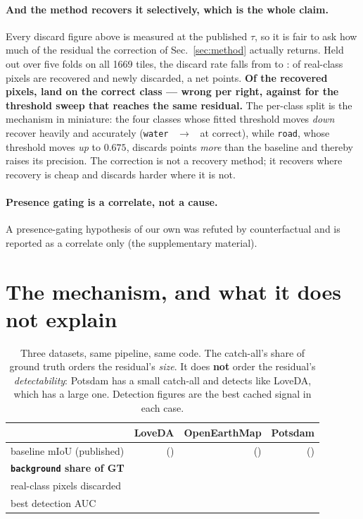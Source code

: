\documentclass[10pt,a4paper]{article}                        %
\newcommand{\best}[1]{\textbf{#1}}
\newcommand{\bg}{\texttt{background}}
\newcommand{\suppref}[1]{the supplementary material}
\begin{document}
\paragraph{And the method recovers it selectively, which is the whole claim.}
Every discard figure above is measured at the published $\tau$, so it is fair to
ask how much of the residual the correction of Sec.~\ref{sec:method} actually
returns. Held out over five folds on all 1669 tiles, the discard rate falls from
\raDiscA{} to \raDiscC{}: \raRecov{} of real-class pixels are recovered and
\raNew{} newly discarded, a net \raDrop{} points. \best{Of the recovered pixels,
\raCorrect{} land on the correct class --- \raWPR{} wrong per right, against
\tauRatio{} for the threshold sweep that reaches the same residual.} The
per-class split is the mechanism in miniature: the four classes whose fitted
threshold moves \emph{down} recover heavily and accurately (\texttt{water}
\raWaterA{}~$\to$~\raWaterC{} at \raWaterOk{} correct), while
\texttt{road}, whose threshold moves \emph{up} to $0.675$, discards
\raRoadDelta{} points \emph{more} than the baseline and thereby raises its
precision. The correction is not a recovery method; it recovers where recovery
is cheap and discards harder where it is not.

\paragraph{Presence gating is a correlate, not a cause.} A presence-gating hypothesis of our own was refuted by counterfactual and is reported as a correlate only (\suppref{sup:presence}).

\section{The mechanism, and what it does not explain}
\label{sec:mechanism}

\begin{table}[t]\centering\small
\caption{Three datasets, same pipeline, same code. The catch-all's share of ground
truth orders the residual's \emph{size}. It does \best{not} order the residual's
\emph{detectability}: Potsdam has a small catch-all and detects like LoveDA, which
has a large one. Detection figures are the best cached signal in each case.}
\label{tab:mechanism}
\begin{tabular}{lrrr}
\toprule
 & LoveDA & OpenEarthMap & Potsdam \\
\midrule
baseline mIoU (published) & \loveBase{} (\lovePub{}) & \oemBase{} (\oemPub{}) & \potsBase{} (\potsPub{}) \\
\best{\bg{} share of GT}  & \best{\bgShareLove{}} & \best{\bgShareOEM{}} & \best{\potsShare{}} \\
real-class pixels discarded & \discardPct{} & \discardOEM{} & \potsDiscard{} \\
\midrule
best detection AUC        & \aucLoveCached{} & \best{\aucOemCached{}} & \potsAuc{} \\
\bottomrule
\end{tabular}
\end{table}
\end{document}
